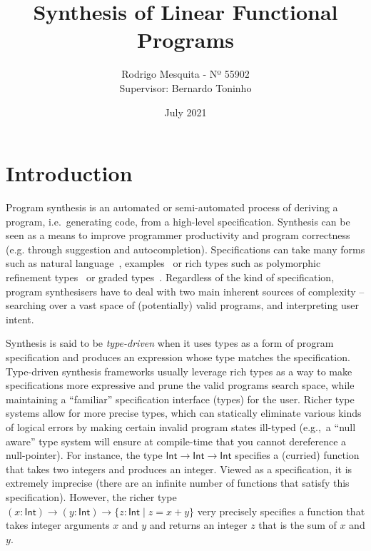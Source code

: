 \documentclass{llncs}
\title{Synthesis of Linear Functional Programs}
\author{Rodrigo Mesquita - Nº 55902 \\
    Supervisor: Bernardo Toninho}
\date{July 2021}
\institute{NOVA School of Science and Technology}
\begin{document}
\maketitle

\section{Introduction}

Program synthesis is an automated or semi-automated process of deriving a
program, i.e.~generating code, from a high-level specification. Synthesis can be
seen as a means to improve programmer productivity and program correctness
(e.g. through suggestion and autocompletion).
%
Specifications can take many forms such as natural
language~\cite{chen2021evaluating},
examples~\cite{DBLP:conf/popl/FrankleOWZ16} or rich types such as
polymorphic refinement types~\cite{DBLP:conf/pldi/PolikarpovaKS16} or
graded types~\cite{DBLP:conf/lopstr/HughesO20}. Regardless of the kind
of specification, program synthesisers have to deal with two main
inherent sources of complexity -- searching over a vast space of
(potentially) valid programs, and interpreting user intent.

Synthesis is said to be \emph{type-driven} when it uses types as a form of program
specification and produces an expression whose type matches the specification.
Type-driven synthesis frameworks usually leverage rich types as a way to make
specifications more expressive and prune the valid programs search space, while
maintaining a ``familiar'' specification interface (types) for the user.
%
Richer type systems allow for more precise types, which can statically eliminate
various kinds of logical errors by making certain invalid program states
ill-typed (e.g.,~a ``null aware'' type system will ensure at compile-time that
you cannot dereference a null-pointer).
%
%
For instance, the type $\mathsf{Int} \rightarrow \mathsf{Int} \rightarrow
\mathsf{Int}$ specifies a (curried) function that takes two integers and
produces an integer. Viewed as a specification, it is extremely imprecise (there
are an infinite number of functions that satisfy this specification).  However,
the richer type $(x{:}\mathsf{Int}) \rightarrow (y{:}\mathsf{Int}) \rightarrow
\{z{:}\mathsf{Int} \mid z = x+y\}$ very precisely specifies a function that
takes integer arguments $x$ and $y$ and returns an integer $z$ that is the sum
of $x$ and $y$.
\end{document}
